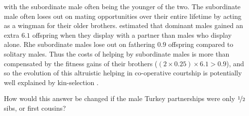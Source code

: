 with the subordinate male often being the younger of the two. The
subordinate male often loses out on mating opportunities over their
entire lifetime by acting as a wingman for their older 
brothers. \citet{krakauer2005kin} estimated that dominant males gained
an extra $6.1$ offspring when they display with a partner than males
who display alone. Rhe subordinate males lose out on fathering $0.9$
offspring compared to solitary males. Thus the costs of helping by
subordinate males is more than compensated by the fitness gains of
their brothers ($(2 \times 0.25)  \times 6.1 > 0.9$), and so the
evolution of this  altruistic  helping in co-operative courtship is potentially well explained by kin-selection \citep[see ][for more analysis]{akccay2016}.
\begin{question}{}
How would this answer be changed if the male Turkey partnerships were only
$\nicefrac{1}{2}$ sibs, or first cousins?
\end{question}


